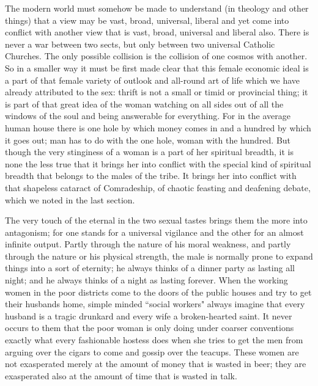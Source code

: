 \documentclass[final,10pt,letterpaper,twocolumn,openany]{book}
\begin{document}
The modern world must somehow be made to understand (in theology
and other things) that a view may be vast, broad, universal, liberal and yet
come into conflict with another view that is vast, broad, universal and
liberal also. There is never a war between two sects, but only between two
universal Catholic Churches. The only possible collision is the collision of
one cosmos with another. So in a smaller way it must be first made clear
that this female economic ideal is a part of that female variety of outlook
and all-round art of life which we have already attributed to the sex: thrift
is not a small or timid or provincial thing; it is part of that great idea of the
woman watching on all sides out of all the windows of the soul and being
answerable for everything. For in the average human house there is one
hole by which money comes in and a hundred by which it goes out; man
has to do with the one hole, woman with the hundred. But though the very
stinginess of a woman is a part of her spiritual breadth, it is none the less
true that it brings her into conflict with the special kind of spiritual breadth
that belongs to the males of the tribe. It brings her into conflict with that
shapeless cataract of Comradeship, of chaotic feasting and deafening
debate, which we noted in the last section. 

The very touch of the eternal in
the two sexual tastes brings them the more into antagonism; for one stands
for a universal vigilance and the other for an almost infinite output. Partly
through the nature of his moral weakness, and partly through the nature or
his physical strength, the male is normally prone to expand things into a
sort of eternity; he always thinks of a dinner party as lasting all night; and
he always thinks of a night as lasting forever. When the working women in
the poor districts come to the doors of the public houses and try to get
their husbands home, simple minded ``social workers" always imagine that
every husband is a tragic drunkard and every wife a broken-hearted saint.
It never occurs to them that the poor woman is only doing under coarser
conventions exactly what every fashionable hostess does when she tries to
get the men from arguing over the cigars to come and gossip over the
teacups. These women are not exasperated merely at the amount of money
that is wasted in beer; they are exasperated also at the amount of time that
is wasted in talk.
\end{document}
